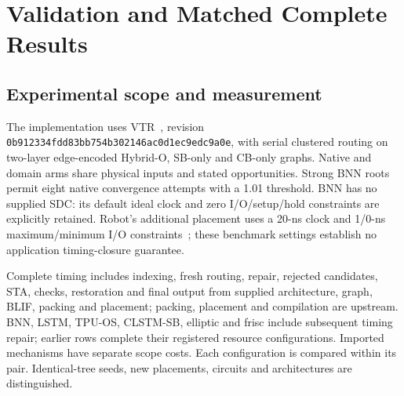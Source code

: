\documentclass[conference,10pt]{IEEEtran}
\begin{document}
\section{Validation and Matched Complete Results}
\subsection{Experimental scope and measurement}
The implementation uses VTR~\cite{vtr9paper}, revision \texttt{0b912334fdd83bb754b302146ac0d1ec9edc9a0e}, with serial clustered routing on two-layer edge-encoded Hybrid-O, SB-only and CB-only graphs. Native and domain arms share physical inputs and stated opportunities. Strong BNN roots permit eight native convergence attempts with a 1.01 threshold. BNN has no supplied SDC: its default ideal clock and zero I/O/setup/hold constraints are explicitly retained. Robot's additional placement uses a 20-ns clock and 1/0-ns maximum/minimum I/O constraints~\cite{vprsdc}; these benchmark settings establish no application timing-closure guarantee.

Complete timing includes indexing, fresh routing, repair, rejected candidates, STA, checks, restoration and final output from supplied architecture, graph, BLIF, packing and placement; packing, placement and compilation are upstream. BNN, LSTM, TPU-OS, CLSTM-SB, elliptic and frisc include subsequent timing repair; earlier rows complete their registered resource configurations. Imported mechanisms have separate scope costs. Each configuration is compared within its pair. Identical-tree seeds, new placements, circuits and architectures are distinguished.
\end{document}

